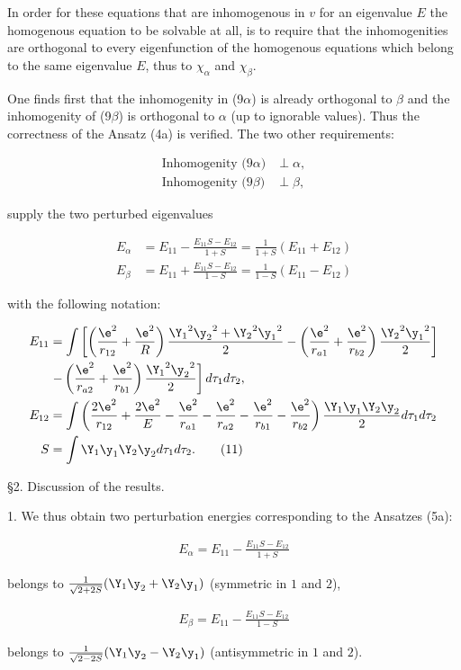 \documentclass{article}
\newcommand{\nequ}[2]{
\begin{align*}
#1
\tag{#2}
\end{align*}
}
\newcommand{\uequ}[1]{
\begin{align*}
#1
\end{align*}
}
\begin{document}
In order for these equations that are inhomogenous in $v$ for an eigenvalue $E$ the homogenous equation to be solvable at all, is to require that the inhomogenities are orthogonal to every eigenfunction of the homogenous equations which belong to the same eigenvalue $E$, thus to $\chi_\alpha$ and $\chi_\beta$.

One finds first that the inhomogenity in (9$\alpha$) is already orthogonal to $\beta$ and the inhomogenity of (9$\beta$) is orthogonal to $\alpha$ (up to ignorable values). Thus the correctness of the Ansatz (4a) is verified. The two other requirements:
\uequ{
\text{Inhomogenity (9$\alpha$)} &\perp \alpha,\\
\text{Inhomogenity (9$\beta$)} &\perp \beta,
}
supply the two perturbed eigenvalues
\nequ{
E_\alpha &= E_{11} - \frac{E_{11}S - E_{12}}{1 + S} = \frac{1}{1+S}(E_{11} + E_{12})\\
E_\beta &=  E_{11} + \frac{E_{11}S - E_{12}}{1 - S} = \frac{1}{1-S}(E_{11} - E_{12})
}{10}
with the following notation:
\nequ{
E_{11} &= \int\left[\left(\frac{\e^2}{r_{12}} + \frac{\e^2}{R} \right)
\frac{{\Y_1}^2{\y_2}^2 + {\Y_2}^2{\y_1}^2}{2} - 
\left(\frac{\e^2}{r_{a1}} + \frac{\e^2}{r_{b2}}\right)\frac{{\Y_2}^2{\y_1}^2}{2}\right] \\
&\left. -\left(\frac{\e^2}{r_{a2}} + \frac{\e^2}{r_{b1}}\right)
\frac{{\Y_1}^2{\y_2}^2}{2}\right] d\tau_1 d\tau_2,\\
E_{12} &= \int\left(\frac{2\e^2}{r_{12}} + \frac{2\e^2}{E}
 - \frac{\e^2}{r_{a1}} - \frac{\e^2}{r_{a2}} - \frac{\e^2}{r_{b1}} - \frac{\e^2}{r_{b2}}\right)
 \frac{\Y_1\y_1\Y_2\y_2}{2}d\tau_1 d\tau_2\\
S &= \int\Y_1\y_1\Y_2\y_2 d\tau_1 d\tau_2.
}{11}

§2. Discussion of the results.

1. We thus obtain two perturbation energies corresponding to the Ansatzes (5a):
\uequ{
E_\alpha = E_{11} - \frac{E_{11}S - E_{12}}{1 + S}
}
belongs to $\frac{1}{\sqrt{2 + 2S}}(\Y_1\y_2 + \Y_2\y_1)$ (symmetric in $1$ and $2$),
\uequ{
E_\beta = E_{11} - \frac{E_{11}S - E_{12}}{1 - S}
}
belongs to $\frac{1}{\sqrt{2 - 2S}}(\Y_1\y_2 - \Y_2\y_1)$ (antisymmetric in $1$ and $2$).
\end{document}
